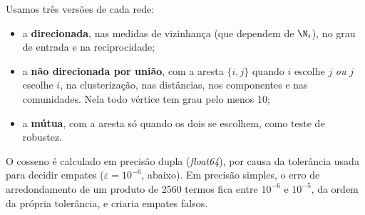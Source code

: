 Usamos três versões de cada rede:
\begin{itemize}
    \item a \textbf{direcionada}, nas medidas de vizinhança (que dependem de $\N_i$), no grau
    de entrada e na reciprocidade;
    \item a \textbf{não direcionada por união}, com a aresta $\{i,j\}$ quando $i$ escolhe $j$
    \emph{ou} $j$ escolhe $i$, na clusterização, nas distâncias, nos componentes e nas
    comunidades. Nela todo vértice tem grau pelo menos 10;
    \item a \textbf{mútua}, com a aresta só quando os dois se escolhem, como teste de
    robustez.
\end{itemize}

O cosseno é calculado em precisão dupla (\emph{float64}), por causa da tolerância usada para
decidir empates ($\varepsilon=10^{-6}$, abaixo). Em precisão simples, o erro de arredondamento
de um produto de 2560 termos fica entre $10^{-6}$ e $10^{-5}$, da ordem da própria tolerância,
e criaria empates falsos.

